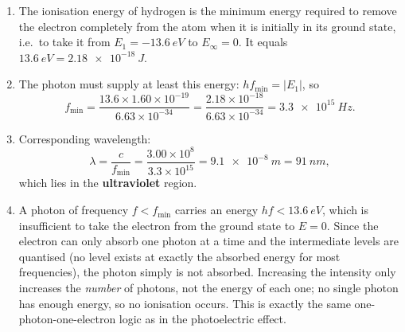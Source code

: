 \documentclass[11pt]{article}
\newcommand{\cle}[1]{{\popxbold\color{popdark}#1}}
\begin{document}
\begin{corrige}
\begin{enumerate}
\item The \cle{ionisation energy} of hydrogen is the minimum energy required to remove the electron completely from the atom when it is initially in its ground state, i.e.\ to take it from $E_1 = \SI{-13.6}{eV}$ to $E_{\infty} = 0$. It equals $\SI{13.6}{eV} = \SI{2.18e-18}{J}$.
\item The photon must supply at least this energy: $hf_{\min} = |E_1|$, so
\[ f_{\min} = \frac{13.6 \times 1.60\times 10^{-19}}{6.63\times 10^{-34}}
= \frac{2.18\times 10^{-18}}{6.63\times 10^{-34}}
= \boxed{\SI{3.3e15}{Hz}}. \]
\item Corresponding wavelength:
\[ \lambda = \frac{c}{f_{\min}} = \frac{3.00\times 10^{8}}{3.3\times 10^{15}} = \boxed{\SI{9.1e-8}{m}} = \SI{91}{nm}, \]
which lies in the \textbf{ultraviolet} region.
\item A photon of frequency $f < f_{\min}$ carries an energy $hf < \SI{13.6}{eV}$, which is insufficient to take the electron from the ground state to $E = 0$. Since the electron can only absorb one photon at a time and the intermediate levels are quantised (no level exists at exactly the absorbed energy for most frequencies), the photon simply is not absorbed. Increasing the intensity only increases the \emph{number} of photons, not the energy of each one; no single photon has enough energy, so no ionisation occurs. This is exactly the same one-photon-one-electron logic as in the photoelectric effect.
\end{enumerate}
\end{corrige}
\end{document}

